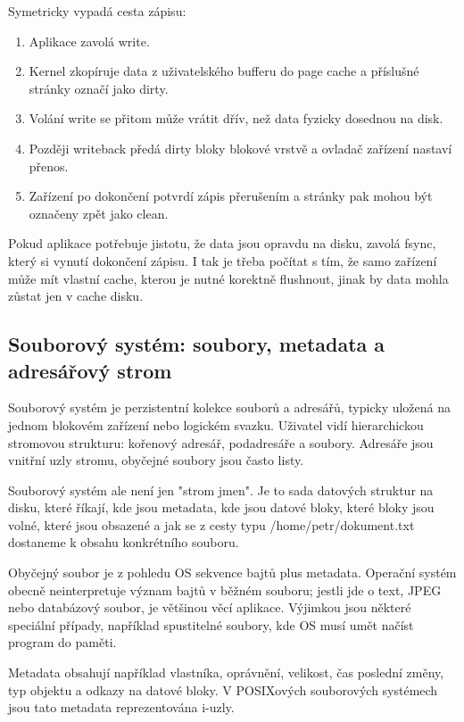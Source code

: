 \documentclass[11pt,a4paper]{article}
\begin{document}
Symetricky vypadá cesta zápisu:
\begin{enumerate}
  \item Aplikace zavolá write.
  \item Kernel zkopíruje data z uživatelského bufferu do page cache a příslušné stránky označí jako dirty.
  \item Volání write se přitom může vrátit dřív, než data fyzicky dosednou na disk.
  \item Později writeback předá dirty bloky blokové vrstvě a ovladač zařízení nastaví přenos.
  \item Zařízení po dokončení potvrdí zápis přerušením a stránky pak mohou být označeny zpět jako clean.
\end{enumerate}

Pokud aplikace potřebuje jistotu, že data jsou opravdu na disku, zavolá fsync, který si vynutí dokončení zápisu. I tak je třeba počítat s tím, že samo zařízení může mít vlastní cache, kterou je nutné korektně flushnout, jinak by data mohla zůstat jen v cache disku.

\subsection*{Souborový systém: soubory, metadata a adresářový strom}

Souborový systém je perzistentní kolekce souborů a adresářů, typicky uložená na jednom blokovém zařízení nebo logickém svazku. Uživatel vidí hierarchickou stromovou strukturu: kořenový adresář, podadresáře a soubory. Adresáře jsou vnitřní uzly stromu, obyčejné soubory jsou často listy.

Souborový systém ale není jen "strom jmen". Je to sada datových struktur na disku, které říkají, kde jsou metadata, kde jsou datové bloky, které bloky jsou volné, které jsou obsazené a jak se z cesty typu /home/petr/dokument.txt dostaneme k obsahu konkrétního souboru.

Obyčejný soubor je z pohledu OS sekvence bajtů plus metadata. Operační systém obecně neinterpretuje význam bajtů v běžném souboru; jestli jde o text, JPEG nebo databázový soubor, je většinou věcí aplikace. Výjimkou jsou některé speciální případy, například spustitelné soubory, kde OS musí umět načíst program do paměti.

Metadata obsahují například vlastníka, oprávnění, velikost, čas poslední změny, typ objektu a odkazy na datové bloky. V POSIXových souborových systémech jsou tato metadata reprezentována i-uzly.
\end{document}
